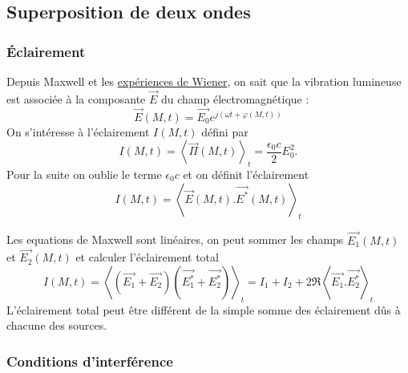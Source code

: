 \subsection{Superposition de deux ondes}

\subsubsection{Éclairement}

Depuis Maxwell et les \href{https://www.google.com/url?sa=t&rct=j&q=&esrc=s&source=web&cd=4&ved=2ahUKEwiE3pWF46zpAhX9DWMBHR5kB_MQFjADegQIAhAB&url=https\%3A\%2F\%2Fhal.archives-ouvertes.fr\%2Fjpa-00239559\%2Fdocument&usg=AOvVaw15J8QmwZUAwWgu9l70T_AH}{expériences de Wiener}, on sait que la vibration lumineuse est associée à la composante $\overrightarrow{E}$ du champ électromagnétique :
\begin{equation}
\overrightarrow{E}(M,t) = \overrightarrow{E_0}e^{j(\omega t +\varphi(M,t))}
\end{equation}
On s'intéresse à l'éclairement $I(M,t)$ défini par
\begin{equation}
I(M,t) = \left< \overrightarrow{\Pi}(M,t)\right>_t = \frac{\epsilon_0 c}{2}E_0^2.
\end{equation}
Pour la suite on oublie le terme $\epsilon_0 c$ et on définit l'éclairement
\begin{equation}
I(M,t) = \left< \overrightarrow{E}(M,t).\overrightarrow{E^*}(M,t)\right>_t
\end{equation}

Les equations de Maxwell sont linéaires, on peut sommer les champs $\overrightarrow{E_1}(M,t)$ et $\overrightarrow{E_2}(M,t)$ et calculer l'éclairement total
\begin{equation}
I(M,t) = \left< (\overrightarrow{E_1} + \overrightarrow{E_2})(\overrightarrow{E_1^*} + \overrightarrow{E_2^*}) \right>_t = I_1 + I_2 + 2\Re\left< \overrightarrow{E_1}.\overrightarrow{E_2^*} \right>_t 
\end{equation}
L'éclairement total peut être différent de la simple somme des éclairement dûs à chacune des sources.

\subsubsection{Conditions d'interférence}

